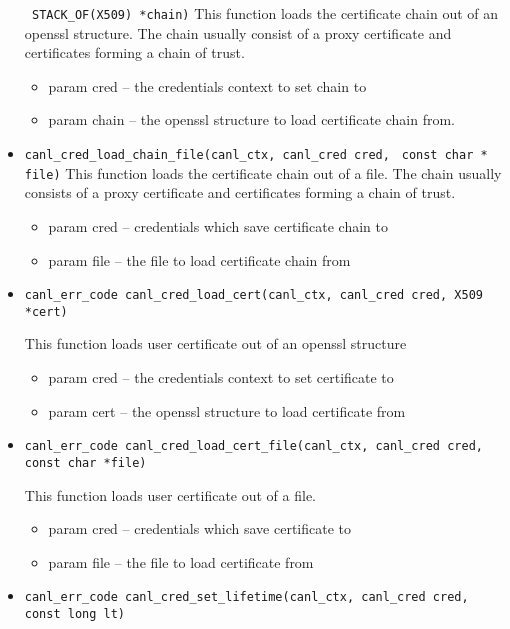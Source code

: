 \begin{itemize}
  \verb' STACK_OF(X509) *chain)'
  This function loads the certificate chain out of an openssl structure. The 
  chain usually 
  consist of a proxy certificate and certificates forming
  a chain of trust.
  \begin{itemize}
    \item param cred -- the credentials context to set chain to
    \item param chain -- the openssl structure to load certificate chain from.
  \end{itemize}
  \item \verb'canl_cred_load_chain_file(canl_ctx, canl_cred cred,'
  \verb' const char * file)'
  This function loads the certificate chain out of a file. The chain usually 
  consists of a proxy certificate and certificates forming
  a chain of trust.
  \begin{itemize}
    \item param cred -- credentials which save certificate chain to
    \item param file -- the file to load certificate chain from
  \end{itemize}
  \item \begin{verbatim}
canl_err_code canl_cred_load_cert(canl_ctx, canl_cred cred, X509 *cert)\end{verbatim}
  This function loads user certificate out of an openssl structure
  \begin{itemize}
    \item param cred -- the credentials context to set certificate to 
    \item param cert -- the openssl structure to load certificate from
    \end{itemize}
  \item \begin{verbatim}
canl_err_code canl_cred_load_cert_file(canl_ctx, canl_cred cred, 
const char *file)\end{verbatim}
  This function loads user certificate out of a file.
  \begin{itemize}
    \item param cred -- credentials which save certificate to
    \item param file -- the file to load certificate from
  \end{itemize}
  \item \begin{verbatim}
canl_err_code canl_cred_set_lifetime(canl_ctx, canl_cred cred, const long lt)\end{verbatim}

\end{itemize}
